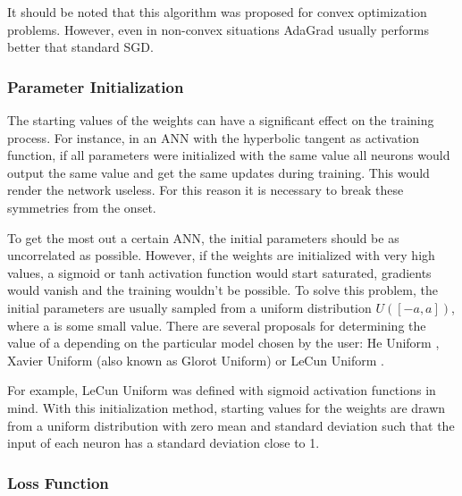 It should be noted that this algorithm was proposed for convex optimization problems. However, even in non-convex situations AdaGrad usually performs better that standard SGD.\cite{gupta2014training}

\subsubsection{Parameter Initialization}

The starting values of the weights can have a significant effect on the training process. For instance, in an ANN with the hyperbolic tangent as activation function, if all parameters were initialized with the same value all neurons would output the same value and get the same updates during training. This would render the network useless. For this reason it is necessary to break these symmetries from the onset.

To get the most out a certain ANN, the initial parameters should be as  uncorrelated as possible. However, if the weights are initialized with very high values, a sigmoid or tanh activation function would start saturated, gradients would vanish and the training wouldn't be possible.
To solve this problem, the initial parameters are usually  sampled from a uniform distribution $U([-a,a])$, where a is some small value. There are several proposals for determining the value of a depending on the particular model chosen by the user: He Uniform \cite{he2015delving}, Xavier Uniform \cite{glorot2010understanding} (also known as Glorot Uniform) or LeCun Uniform \cite{lecun2012efficient}.

For example, LeCun Uniform was defined with sigmoid activation functions in mind. With this initialization method, starting values for the weights are drawn from a uniform distribution with zero mean and standard deviation such that the input of each neuron has a standard deviation close to 1.

\subsubsection{Loss Function}
\label{subsubsec:loss-function}

